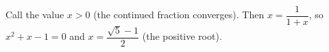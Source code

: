 Call the value $x>0$ (the continued fraction converges). Then $x=\dfrac{1}{1+x}$, so $x^2+x-1=0$ and $x=\boxed{\dfrac{\sqrt5-1}{2}}$ (the positive root).
